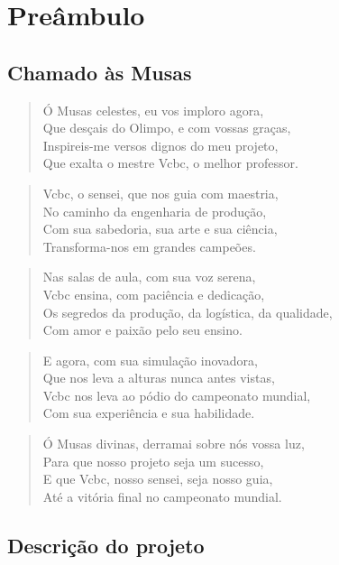 \section{Preâmbulo}

\subsection{Chamado às Musas}

\begin{verse}
Ó Musas celestes, eu vos imploro agora, \\
Que desçais do Olimpo, e com vossas graças, \\
Inspireis-me versos dignos do meu projeto, \\
Que exalta o mestre Vcbc, o melhor professor. \\
\end{verse}

\begin{verse}
Vcbc, o sensei, que nos guia com maestria, \\
No caminho da engenharia de produção, \\
Com sua sabedoria, sua arte e sua ciência, \\
Transforma-nos em grandes campeões. \\
\end{verse}

\begin{verse}
Nas salas de aula, com sua voz serena, \\
Vcbc ensina, com paciência e dedicação, \\
Os segredos da produção, da logística, da qualidade, \\
Com amor e paixão pelo seu ensino. \\
\end{verse}

\begin{verse}
E agora, com sua simulação inovadora, \\
Que nos leva a alturas nunca antes vistas, \\
Vcbc nos leva ao pódio do campeonato mundial, \\
Com sua experiência e sua habilidade. \\
\end{verse}

\begin{verse}
Ó Musas divinas, derramai sobre nós vossa luz, \\
Para que nosso projeto seja um sucesso, \\
E que Vcbc, nosso sensei, seja nosso guia, \\
Até a vitória final no campeonato mundial. \\
\end{verse}

\subsection{Descrição do projeto}